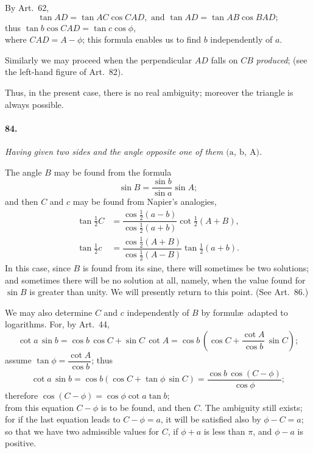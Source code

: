 \documentclass{book}[2004/02/16]
\begin{document}
\begin{mainmatter}
\begin{spacing}{1.3}
By Art.\ 62,
\[
  \tan AD = \tan AC \cos CAD,\text{ and }
  \tan AD = \tan AB \cos BAD;
\]
thus \hfill$\tan b \cos CAD = \tan c \cos \phi$,\hfill\phantom{thus}\\[1ex]
where $CAD = A - \phi$; this formula enables us to find $b$ independently
of $a$.

Similarly we may proceed when the perpendicular $AD$ falls on
$CB$ \textit{produced}; (see the left-hand figure of Art.~82).

Thus, in the present case, there is no real ambiguity; moreover
the triangle is always possible.

\paragraph{84.} \textit{Having given two sides and the angle opposite one of them
$(\mathrm a$, $\mathrm b$, $\mathrm A)$.}

The angle $B$ may be found from the formula
\[
  \sin B = \frac{\sin b}{\sin a} \sin A;
\]
and then $C$ and $c$ may be found from Napier's analogies,
\begin{align*}
  \tan \tfrac{1}{2} C
&= \dfrac{\cos \tfrac{1}{2} (a - b)}
        {\cos \tfrac{1}{2} (a + b)} \cot \tfrac{1}{2} (A + B),
\\[1ex]
  \tan \tfrac{1}{2} c
&= \dfrac{\cos \tfrac{1}{2} (A + B)}
        {\cos \tfrac{1}{2} (A - B)} \tan \tfrac{1}{2} (a + b).
\end{align*}
In this case, since $B$ is found from its sine, there will sometimes
be two solutions; and sometimes there will be no solution at all,
namely, when the value found for $\sin B$ is greater than unity. We
will presently return to this point. (See Art.~86.)

We may also determine $C$ and $c$ independently of $B$ by formul\ae\
adapted to logarithms. For, by Art.~44,
\[
  \cot a\, \sin b
= \cos b\, \cos C + \sin C\, \cot A
= \cos b\, (\cos C + \dfrac{\cot A}{\cos b}\, \sin C);
\]
assume $\tan \phi = \dfrac{\cot A}{\cos b}$; thus
\[
  \cot a\, \sin b
= \cos b (\cos C + \tan \phi\, \sin C)
= \dfrac{\cos b\, \cos (C - \phi)}{\cos \phi};
\]
therefore \hfill $
  \cos (C - \phi) = \cos \phi \cot a \tan b$; \hfill\phantom{therefore}\\
from this equation $C - \phi$ is to be found, and then $C$. The ambiguity
still exists; for if the last equation leads to $C - \phi = a$, it
will be satisfied also by $\phi - C = a$; so that we have two admissible
values for $C$, if $\phi + a$ is less than $\pi$, and $\phi - a$ is positive.


\end{spacing}
\end{mainmatter}
\end{document}
